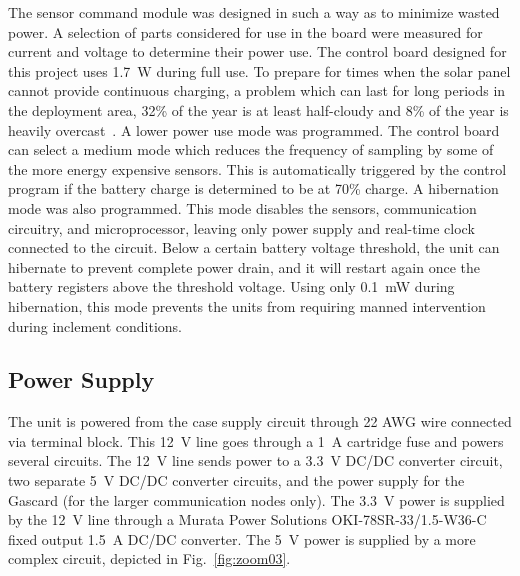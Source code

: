 \documentclass[journal]{IEEEtran}
\begin{document}
The sensor command module was designed in such a way as to minimize wasted power.  A selection of parts considered for use in the board were measured for current and voltage to determine their power use.  The control board designed for this project uses \SI{1.7}{\watt} during full use.  To prepare for times when the solar panel cannot provide continuous charging, a problem which can last for long periods in the deployment area, 32\% of the year is at least half-cloudy and 8\% of the year is heavily overcast~\cite{kswo_weather_2015}. A lower power use mode was programmed.  The control board can select a medium mode which reduces the frequency of sampling by some of the more energy expensive sensors.  This is automatically triggered by the control program if the battery charge is determined to be at 70\% charge.  A hibernation mode was also programmed.  This mode disables the sensors, communication circuitry, and microprocessor, leaving only power supply and real-time clock connected to the circuit.  Below a certain battery voltage threshold, the unit can hibernate to prevent complete power drain, and it will restart again once the battery registers above the threshold voltage.  Using only \SI{0.1}{\milli\watt} during hibernation, this mode prevents the units from requiring manned intervention during inclement conditions.

\subsection{Power Supply}
The unit is powered from the case supply circuit through 22 AWG wire connected via terminal block.  This \SI{12}{\volt} line goes through a \SI{1}{\ampere} cartridge fuse and powers several circuits.  The \SI{12}{\volt} line sends power to a \SI{3.3}{\volt} DC/DC converter circuit, two separate \SI{5}{\volt} DC/DC converter circuits, and the power supply for the Gascard (for the larger communication nodes only).  The \SI{3.3}{\volt} power is supplied by the \SI{12}{\volt} line through a Murata Power Solutions OKI-78SR-33/1.5-W36-C fixed output \SI{1.5}{\ampere} DC/DC converter.  The \SI{5}{\volt} power is supplied by a more complex circuit, depicted in Fig.~\ref{fig:zoom03}.
\end{document}
